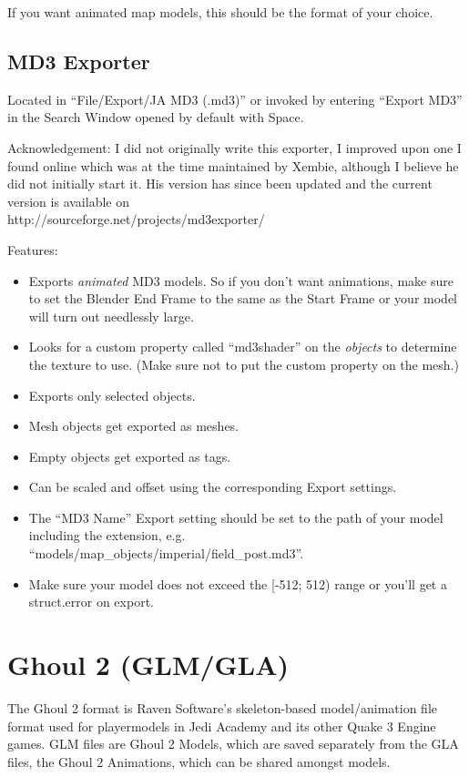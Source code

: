 \documentclass[a4paper,10pt]{article}
\begin{document}
 If you want animated map models, this should be the format of your choice.
 
 \subsection{MD3 Exporter}
 
 Located in ``File/Export/JA MD3 (.md3)'' or invoked by entering ``Export MD3'' in the Search Window
 opened by default with Space.
 
 Acknowledgement: I did not originally write this exporter, I improved upon one I found online which was at
 the time maintained by Xembie, although I believe he did not initially start it. His version has since been
 updated and the current version is available on\\
 http://sourceforge.net/projects/md3exporter/
 
 Features:
 \begin{itemize}
  \item Exports \emph{animated} MD3 models. So if you don't want animations, make sure to set the Blender
  End Frame to the same as the Start Frame or your model will turn out needlessly large.
  \item Looks for a custom property called ``md3shader'' on the \emph{objects} to determine the texture to use.
  (Make sure not to put the custom property on the mesh.) 
  \item Exports only selected objects.
  \item Mesh objects get exported as meshes.
  \item Empty objects get exported as tags.
  \item Can be scaled and offset using the corresponding Export settings.
  \item The ``MD3 Name'' Export setting should be set to the path of your model including the extension, e.g.\\
  ``models/map\_objects/imperial/field\_post.md3''.
  \item Make sure your model does not exceed the [-512; 512) range or you'll get a struct.error on export.
 \end{itemize}

 
 \section{Ghoul 2 (GLM/GLA)}
 
 The Ghoul 2 format is Raven Software's skeleton-based model/animation file format used for playermodels in
 Jedi Academy and its other Quake 3 Engine games. GLM files are Ghoul 2 Models, which are saved separately from
 the GLA files, the Ghoul 2 Animations, which can be shared amongst models.
 
\end{document}

